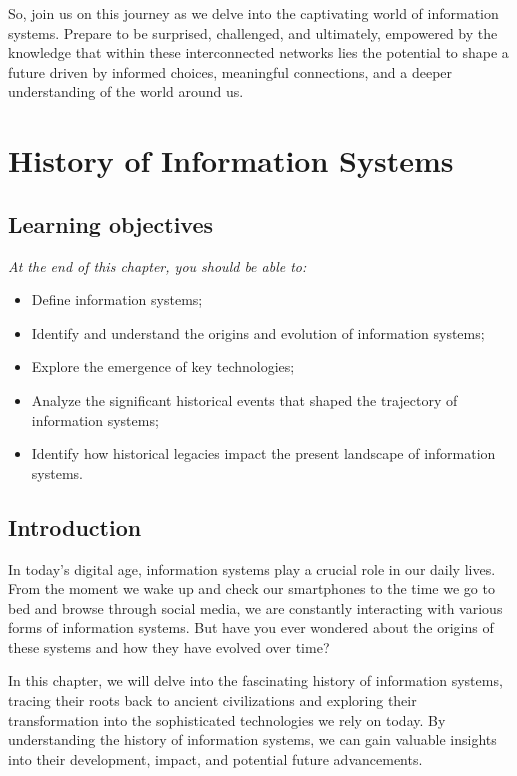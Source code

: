 \documentclass[
  letterpaper,
  DIV=11,
  numbers=noendperiod]{scrreprt}
\providecommand{\tightlist}{%
  \setlength{\itemsep}{0pt}\setlength{\parskip}{0pt}}\usepackage{longtable,booktabs,array}
\begin{document}
So, join us on this journey as we delve into the captivating world of
information systems. Prepare to be surprised, challenged, and
ultimately, empowered by the knowledge that within these interconnected
networks lies the potential to shape a future driven by informed
choices, meaningful connections, and a deeper understanding of the world
around us.


\chapter{History of Information
Systems}\label{history-of-information-systems}

\section{Learning objectives}\label{learning-objectives}

\emph{At the end of this chapter, you should be able to:}

\begin{itemize}
\tightlist
\item
  Define information systems;
\item
  Identify and understand the origins and evolution of information
  systems;
\item
  Explore the emergence of key technologies;
\item
  Analyze the significant historical events that shaped the trajectory
  of information systems;
\item
  Identify how historical legacies impact the present landscape of
  information systems.
\end{itemize}

\section{Introduction}\label{introduction}

In today's digital age, information systems play a crucial role in our
daily lives. From the moment we wake up and check our smartphones to the
time we go to bed and browse through social media, we are constantly
interacting with various forms of information systems. But have you ever
wondered about the origins of these systems and how they have evolved
over time?

In this chapter, we will delve into the fascinating history of
information systems, tracing their roots back to ancient civilizations
and exploring their transformation into the sophisticated technologies
we rely on today. By understanding the history of information systems,
we can gain valuable insights into their development, impact, and
potential future advancements.
\end{document}
